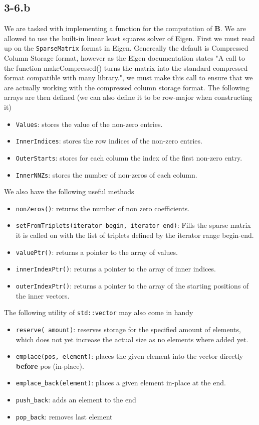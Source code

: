 \documentclass{article}
\begin{document}
 \subsection*{3-6.b}
 We are tasked with implementing a function for the computation of $\mathbf{B}$. We are allowed to use the built-in linear least squares solver of Eigen. First we must read up on the \verb|SparseMatrix| format in Eigen. Genereally the default is Compressed Column Storage format, however as the Eigen documentation states "A call to the function makeCompressed() turns the matrix into the standard compressed format compatible with many library.", we must make this call to ensure that we are actually working with the compressed column storage format. The following arrays are then defined (we can also define it to be row-major when constructing it)
 \begin{itemize}
    \item\verb|Values|: stores the value of the non-zero entries.
    
\item\verb|InnerIndices|: stores the row indices of the non-zero entries.

     \item\verb|OuterStarts|: stores for each column the index of the first non-zero entry.
     \item\verb|InnerNNZs|: stores the number of non-zeros of each column.
 \end{itemize}
 We also have the following useful methods
 \begin{itemize}
     \item \verb|nonZeros()|: returns the number of non zero coefficients.
     \item\verb|setFromTriplets(iterator begin, iterator end)|: Fills the sparse matrix it is called on with the list of triplets defined by the iterator range begin-end. 
     \item\verb|valuePtr()|: returns a  pointer to the array of values.

     \item\verb|innerIndexPtr()|: returns a  pointer to the array of inner indices.
     \item\verb|outerIndexPtr()|: returns a pointer to the array of the starting positions of the inner vectors.
\end{itemize}
The following utility of \verb|std::vector| may also come in handy
\begin{itemize}
    \item \verb|reserve( amount)|: reserves storage for the specified amount of elements, which does not yet increase the actual size as no elements where added yet.
    \item\verb|emplace(pos, element)|: places the given element into the vector directly \textbf{before} pos (in-place).
    \item\verb|emplace_back(element)|: places a given element in-place at the end.
    \item\verb|push_back|: adds an element to the end
    \item\verb|pop_back|: removes last element
\end{itemize}
\end{document}
